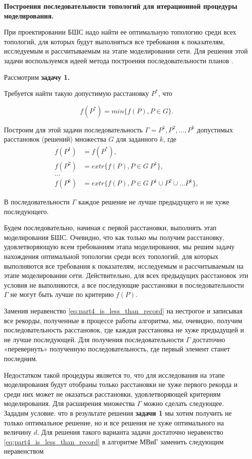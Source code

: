 \textbf{Построения последовательности топологий для итерационной процедуры моделирования.}

При проектировании БШС надо найти ее оптимальную топологию среди всех топологий, для которых будут выполняться все требования к показателям, исследуемым и рассчитываемым на этапе моделировании сети. Для решения этой задачи воспользуемся идеей метода построения последовательности планов \cite{Emelichev}.

Рассмотрим \textbf{задачу 1.}

Требуется найти такую допустимую расстановку $P^*$, что

\begin{displaymath}
    f(P^*) = min \{f(P), P \in G \}.
\end{displaymath}

Построим для этой задачи последовательность $\Gamma = P^1, P^2, ... ,P^k$ допустимых расстановок (решений) множества $G$ для заданного $k$, где 
\begin{align}
    f(P^1) &= f(P^*), \nonumber  \\
    f(P^2) &= extr\{ f(P), P \in G \ P^1 \}, \nonumber \\
    ... \nonumber \\
    f(P^k) &= extr\{ f(P), P \in G \ P^1 \cup P^2 \cup ... P^k \}, \nonumber 
\end{align}

В последовательности $\Gamma$ каждое решение не лучше предыдущего и не хуже последующего.

Будем последовательно, начиная с первой расстановки, выполнять этап моделирования БШС. Очевидно, что как только мы получим расстановку, удовлетворяющую всем требованиям этапа моделирования, мы решим задачу нахождения оптимальной топологии среди всех топологий, для которых выполняются все требования к показателям, исследуемым и рассчитываемым на этапе моделировании сети. Действительно, для всех предыдущих расстановок эти условия не выполняются, а все последующие расстановки в последовательности $\Gamma$ не могут быть лучше по критерию $f(P)$.

Заменив неравенство \cref{eq:part4_is_less_than_record} на нестрогое и записывая все рекорды, полученные в процессе работы алгоритма, мы, очевидно, получим последовательность расстановок, где каждая расстановка не хуже предыдущей и не лучше последующей. Для получения последовательности $\Gamma$ достаточно «перевернуть» полученную последовательность, где первый элемент станет последним.

Недостатком такой процедуры является то, что для исследования на этапе моделирования будут отобраны только расстановки не хуже первого рекорда и среди них может не оказаться расстановки, удовлетворяющей критериям моделирования.
Для расширения множества $\Gamma$ можно сделать следующее. Зададим условие. что в результате решения \textbf{задачи 1} мы хотим получить не только оптимальное решение, но и все решения не хуже оптимального на величину $d$. Для решения такого варианта задачи достаточно неравенство \cref{eq:part4_is_less_than_record} в алгоритме МВиГ заменить следующим неравенством 

